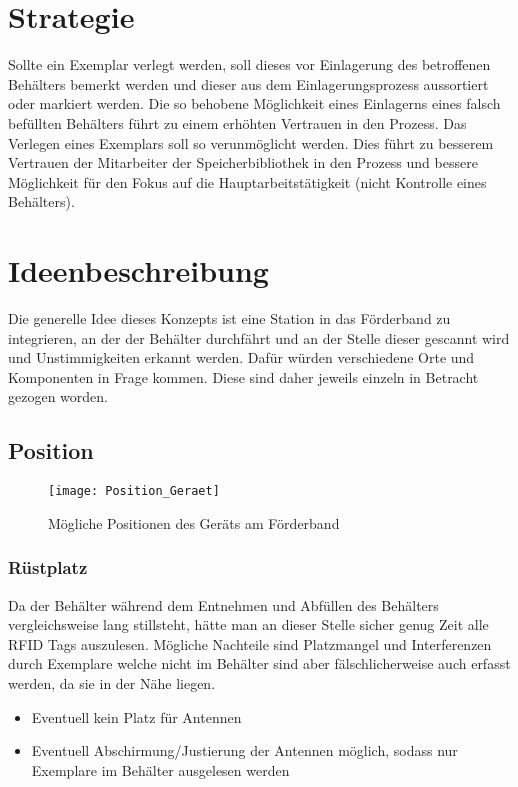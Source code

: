 \section{Strategie}
Sollte ein Exemplar verlegt werden, soll dieses vor Einlagerung des betroffenen Behälters bemerkt werden und dieser aus dem Einlagerungsprozess aussortiert oder markiert werden. Die so behobene Möglichkeit eines Einlagerns eines falsch befüllten Behälters führt zu einem erhöhten Vertrauen in den Prozess. Das Verlegen eines Exemplars soll so verunmöglicht werden. Dies führt zu besserem Vertrauen der Mitarbeiter der Speicherbibliothek in den Prozess und bessere Möglichkeit für den Fokus auf die Hauptarbeitstätigkeit (nicht Kontrolle eines Behälters).

\section{Ideenbeschreibung}

Die generelle Idee dieses Konzepts ist eine Station in das Förderband zu integrieren, an der der Behälter durchfährt und an der Stelle dieser gescannt wird und Unstimmigkeiten erkannt werden. Dafür würden verschiedene Orte und Komponenten in Frage kommen. Diese sind daher jeweils einzeln in Betracht gezogen worden.

\subsection{Position}

\begin{figure}[htb]
	\centering
	\texttt{[image: Position\_Geraet]}
	\caption{Mögliche Positionen des Geräts am Förderband}
\end{figure}

\subsubsection{Rüstplatz}
Da der Behälter während dem Entnehmen und Abfüllen des Behälters vergleichsweise lang stillsteht, hätte man an dieser Stelle sicher genug Zeit alle RFID Tags auszulesen. Mögliche Nachteile sind Platzmangel und Interferenzen durch Exemplare welche nicht im Behälter sind aber fälschlicherweise auch erfasst werden, da sie in der Nähe liegen.
\begin{itemize}
	\pro Genügend Zeit für das Auslesen aller Tags
	\pro Früh im Prozess für eine Meldung
	\con Interferenzen durch RFID markierte Exemplare in der Nähe
	\item Eventuell kein Platz für Antennen
	\item Eventuell Abschirmung/Justierung der Antennen möglich, sodass nur Exemplare im Behälter ausgelesen werden
\end{itemize}

